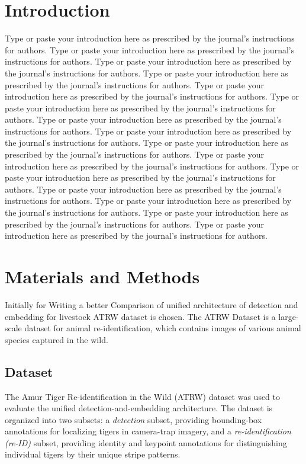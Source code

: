\documentclass[12pt,a4paper]{article}
\begin{document}
\section*{Introduction}
Type or paste your introduction here as prescribed by the journal’s instructions for authors. Type or paste your introduction here as prescribed by the journal’s instructions for authors. Type or paste your introduction here as prescribed by the journal’s instructions for authors. Type or paste your introduction here as prescribed by the journal’s instructions for authors. Type or paste your introduction here as prescribed by the journal’s instructions for authors.
Type or paste your introduction here as prescribed by the journal’s instructions for authors. Type or paste your introduction here as prescribed by the journal’s instructions for authors. Type or paste your introduction here as prescribed by the journal’s instructions for authors. Type or paste your introduction here as prescribed by the journal’s instructions for authors. Type or paste your introduction here as prescribed by the journal’s instructions for authors. 
Type or paste your introduction here as prescribed by the journal’s instructions for authors. Type or paste your introduction here as prescribed by the journal’s instructions for authors. Type or paste your introduction here as prescribed by the journal’s instructions for authors. Type or paste your introduction here as prescribed by the journal’s instructions for authors. Type or paste your introduction here as prescribed by the journal’s instructions for authors. 
\section*{Materials and Methods}
Initially for Writing a better Comparison of unified architecture of detection and embedding for livestock ATRW dataset is chosen.
The ATRW Dataset is a large-scale dataset for animal re-identification, which contains images of various animal species captured in the wild.

\subsection*{Dataset}
The Amur Tiger Re-identification in the Wild (ATRW) dataset was used to evaluate the unified detection-and-embedding architecture. The dataset is organized into two subsets: a \textit{detection} subset, providing bounding-box annotations for localizing tigers in camera-trap imagery, and a \textit{re-identification (re-ID)} subset, providing identity and keypoint annotations for distinguishing individual tigers by their unique stripe patterns.
\end{document}
